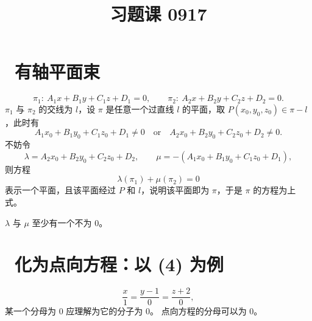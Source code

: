 \documentclass[UTF8,11pt]{ctexart}
\title{习题课 0917}
\date{}
\theoremstyle{cnthm}
\begin{document}
\maketitle

\section{\ 有轴平面束}

\[
\pi_1:\ A_1x+B_1y+C_1z+D_1=0,\qquad
\pi_2:\ A_2x+B_2y+C_2z+D_2=0 .
\]
$\pi_1$ 与 $\pi_2$ 的交线为 $l$，设 $\pi$ 是任意一个过直线
$l$ 的平面，取 $P(x_0,y_0,z_0)\in\pi-l$，此时有
\[
A_1x_0+B_1y_0+C_1z_0+D_1\neq0
\quad\text{or}\quad
A_2x_0+B_2y_0+C_2z_0+D_2\neq0 .
\]
不妨令
\[
\lambda=A_2x_0+B_2y_0+C_2z_0+D_2,\qquad
\mu=-(A_1x_0+B_1y_0+C_1z_0+D_1),
\]
则方程
\[
\lambda(\pi_1)+\mu(\pi_2)=0
\]
表示一个平面，且该平面经过 $P$ 和 $l$，说明该平面即为
$\pi$，于是 $\pi$ 的方程为上式。

$\lambda$ 与 $\mu$ 至少有一个不为 $0$。

\section{\ 化为点向方程：以 (4) 为例}

\[
\frac{x}{1}=\frac{y-1}{0}=\frac{z+2}{0},
\]
某一个分母为 $0$ 应理解为它的分子为 $0$。
点向方程的分母可以为 $0$。
\end{document}
